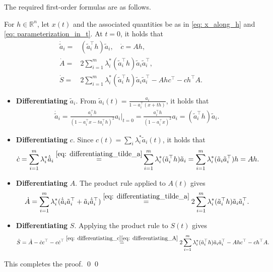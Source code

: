 \documentclass[smallextended]{svjour3}
\let\springerproof\proof
\let\endspringerproof\endproof
\renewenvironment{proof}{\springerproof}{%
  \ifhmode\qed\else\leavevmode\qed\fi\endspringerproof}
\newcommand{\R}{\mathbb{R}}
\begin{document}
The required first-order formulas are as follows.
\begin{lemma}\label{lemma: differentiation}
    For $h\in\R^n$, let $x(t)$ and the associated quantities be as in
    \eqref{eq: x_along_h} and \eqref{eq: parameterization_in_t}. At $t=0$, it holds that 
    \begin{align*}
        \dot{\tilde{a}}_i = & (\tilde{a}_i^\top h)\tilde{a}_i, \quad \dot{c} = Ah, \\
        \dot{A} = & 2 \sum_{i=1}^m \lambda_i^* (\tilde{a}_i^\top h) \tilde{a}_i \tilde{a}_i^\top, \\
        \dot{S} = & 2 \sum_{i=1}^m \lambda_i^* (\tilde{a}_i^\top h) \tilde{a}_i \tilde{a}_i^\top - Ahc^\top -c h^\top A.
    \end{align*}
\end{lemma}
\begin{proof}
    \begin{itemize}
    \item \textbf{Differentiating} $\tilde{a}_i$.
    From $\tilde{a}_i(t) = \frac{a_i}{1 - a_i^\top (x+ th)}$, it holds that 
    \begin{align}\label{eq: differentiating_tilde_a}
        \dot{\tilde{a}}_i =\frac{a_i^\top h}{(1-a_i^\top x - ta_i^\top h)^2} a_i\Bigg|_{t=0} = \frac{a_i^\top h}{(1-a_i^\top x)^2}a_i = (\tilde{a}_i^\top h)\tilde{a}_i.
    \end{align}
    \item \textbf{Differentiating} $c$. Since
    $c(t)=\sum_i\lambda_i^*\tilde a_i(t)$, it holds that 
    \begin{align}\label{eq: differentiating_c}
        \dot{c} = \sum_{i=1}^m \lambda^*_i \dot{\tilde{a}}_i
        \stackrel{\eqref{eq: differentiating_tilde_a}}{=} & \sum_{i=1}^m \lambda_i^* (\tilde{a}_i^\top h)\tilde{a}_i  = \sum_{i=1}^m \lambda_i^* (\tilde{a}_i\tilde{a}_i^\top) h= Ah.
    \end{align}
    \item \textbf{Differentiating} $A$. The product rule applied to $A(t)$ gives
    \begin{align}\label{eq: differentiating_A}
        \dot{A} = \sum_{i=1}^m \lambda_i^*(\dot{\tilde{a}}_i \tilde{a}_i^\top + \tilde{a}_i\dot{\tilde{a}}_i^\top) \stackrel{\eqref{eq: differentiating_tilde_a}}{=} 2 \sum_{i=1}^m \lambda_i^* (\tilde{a}_i^\top h) \tilde{a}_i \tilde{a}_i^\top.
    \end{align}
    \item \textbf{Differentiating} $S$. Applying the product rule to $S(t)$ gives
    \begin{align}
        \dot{S} = \dot{A} - \dot{c}c^\top - c \dot{c}^\top
            \stackrel{\eqref{eq: differentiating_c}\eqref{eq: differentiating_A}}{=} 2 \sum_{i=1}^m \lambda_i^* (\tilde{a}_i^\top h) \tilde{a}_i \tilde{a}_i^\top - Ahc^\top -c h^\top A.  \notag
    \end{align}
    \end{itemize}
    This completes the proof. 
\end{proof}
\end{document}

